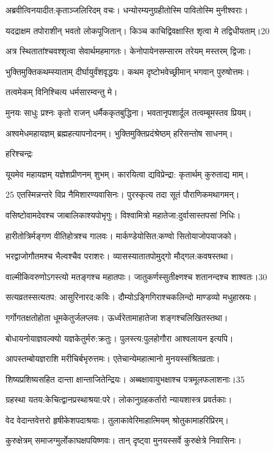 अब्रवीत्विनयादीत:कृताञ्जलिरिदम् वचः।
धन्योरम्यनुग्रहीतोस्मि पावितोस्मि मुनीश्वराः।

यदद्राक्षम तपोराशीन् भवतो लोकपूजितान्।
किञ्च काचिद्विवक्षास्ति शृत्वा मे तद्विधीयताम्।20

अत्र स्थितातांश्चवश्शृत्वा सेवार्थमहमागतः।
केनोपायेनसम्सारम तरेयम् मस्तरम् द्विजाः।

भुक्तिमुक्तिकथम्स्याताम् दीर्घायुर्वंशवृद्धयः।
कथम दृष्टोभवेच्छ्रीमान् भगवान् पुरुषोत्तमः।

तत्वमेकम् विनिश्चित्य धर्मसारम्वन्तु मे। 

मुनयः 
साधुः प्रश्नः कृतो राजन् धर्मैककृतबुद्धिना।
भवतानृपशार्दूल तत्वम्बूमस्तव प्रियम्।

अश्वमेधमहायज्ञम् ब्रह्महत्यापनोदनम्।
भुक्तिमुक्तिप्रदंश्रेष्ठम् हरिसन्तोष साधनम्।

हरिश्चन्द्रः

यूयमेव महायज्ञम् यज्ञेशप्रीणनम् शुभम्।
कारयित्वा द्यविप्रेन्द्रा: कृतार्थम् कुरुताद्य माम्।

25 एतस्मिन्नन्तरे विप्र नैमिशारण्यवासिनः।
पुरस्कृत्य तदा सूतं पौराणिकमथागमन्।

वसिष्टोवामदेवश्च जाबालिकाश्यपोभृगुः।
विश्वामित्रो महातेजा:दुर्वासास्तपसां निधिः।

हारीतोत्रिर्मङ्गण वीतिहोत्रश्च गालवः।
मार्कण्डेयोसित:कण्वो सितोयाजोपयाजको।

भरद्वाजोगौतमश्च भैल्वश्चैव पराशरः।
व्यासस्यातातपोमुद्गो मौद्गल:कवषस्तथा।

वाल्मीकिवरुणोऽगस्त्यो मतङ्गश्च महातपाः।
जातुकर्णस्सुतीक्ष्णश्च शतानन्दश्च शाश्वतः।30

 सत्यव्रतस्सत्यतप: आसुरिनारद:कविः।
दौम्योऽङ्गिगिराश्चकलिन्दो माण्डव्यो मधुहास्रयः।

गर्गोगतक्षतोहोता धूमकेतुर्जलप्लवः।
ऊर्ध्वरेतामाहातेजा शङ्गश्चलिखितस्तथा।

बोधायनोयाज्ञवल्क्यो यज्ञकेतुर्मरु:क्रतुः।
पुलस्त्य:पुलहोगौरा आश्वलायन इत्यपि।

आपस्तम्बोयज्ञराशि मरीचिर्बभृरुत्तमः।
 एतेचान्येमहात्मानो मुनयस्संश्रितव्रताः।
 
 शिष्यप्रशिष्यसहित दान्ता क्षान्ताजितेन्द्रियः।
 अब्बक्षावायुभक्षाश्च पत्रमूलफलाशनाः।35

 ग्रहस्था यतय:केचित्द्वानप्रस्थाश्रया:परे।
 लोकानुग्रहकर्तारो न्यायशास्त्र प्रवर्तकाः।
 
 वेद वेदान्तवेत्तरो हृषीकेशपदाश्रयाः।
 तुलाकावेरिमाहात्मियम् श्रोतुकामाहरिप्रिरम्।
 
 कुरुक्षेत्रम् समाजग्मुर्लोकाघक्षपयिष्णवः।
 तान् दृष्ट्वा मुनयस्सर्वे कुरुक्षेत्रे निवासिनः।
 
